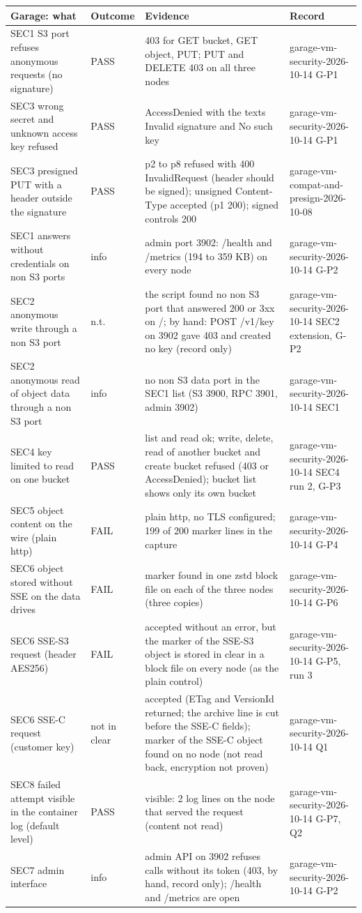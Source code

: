 \begin{tabular}{@{}p{3.6cm}lp{7.4cm}p{3.6cm}@{}}
\toprule
Garage: what & Outcome & Evidence & Record \\
\midrule
SEC1 S3 port refuses anonymous requests (no signature) & PASS & 403 for GET bucket, GET object, PUT; PUT and DELETE 403 on all three nodes & garage-vm-security-2026-10-14 G-P1 \\
SEC3 wrong secret and unknown access key refused & PASS & AccessDenied with the texts Invalid signature and No such key & garage-vm-security-2026-10-14 G-P1 \\
SEC3 presigned PUT with a header outside the signature & PASS & p2 to p8 refused with 400 InvalidRequest (header should be signed); unsigned Content-Type accepted (p1 200); signed controls 200 & garage-vm-compat-and-presign-2026-10-08 \\
SEC1 answers without credentials on non S3 ports & info & admin port 3902: /health and /metrics (194 to 359 KB) on every node & garage-vm-security-2026-10-14 G-P2 \\
SEC2 anonymous write through a non S3 port & n.t. & the script found no non S3 port that answered 200 or 3xx on /; by hand: POST /v1/key on 3902 gave 403 and created no key (record only) & garage-vm-security-2026-10-14 SEC2 extension, G-P2 \\
SEC2 anonymous read of object data through a non S3 port & info & no non S3 data port in the SEC1 list (S3 3900, RPC 3901, admin 3902) & garage-vm-security-2026-10-14 SEC1 \\
SEC4 key limited to read on one bucket & PASS & list and read ok; write, delete, read of another bucket and create bucket refused (403 or AccessDenied); bucket list shows only its own bucket & garage-vm-security-2026-10-14 SEC4 run 2, G-P3 \\
SEC5 object content on the wire (plain http) & FAIL & plain http, no TLS configured; 199 of 200 marker lines in the capture & garage-vm-security-2026-10-14 G-P4 \\
SEC6 object stored without SSE on the data drives & FAIL & marker found in one zstd block file on each of the three nodes (three copies) & garage-vm-security-2026-10-14 G-P6 \\
SEC6 SSE-S3 request (header AES256) & FAIL & accepted without an error, but the marker of the SSE-S3 object is stored in clear in a block file on every node (as the plain control) & garage-vm-security-2026-10-14 G-P5, run 3 \\
SEC6 SSE-C request (customer key) & not in clear & accepted (ETag and VersionId returned; the archive line is cut before the SSE-C fields); marker of the SSE-C object found on no node (not read back, encryption not proven) & garage-vm-security-2026-10-14 Q1 \\
SEC8 failed attempt visible in the container log (default level) & PASS & visible: 2 log lines on the node that served the request (content not read) & garage-vm-security-2026-10-14 G-P7, Q2 \\
SEC7 admin interface & info & admin API on 3902 refuses calls without its token (403, by hand, record only); /health and /metrics are open & garage-vm-security-2026-10-14 G-P2 \\
\bottomrule
\end{tabular}
